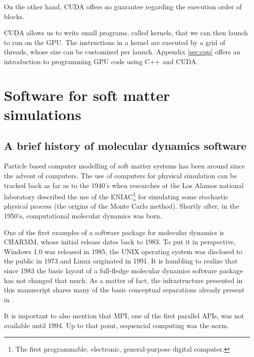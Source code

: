 \documentclass[ twoside,openright,titlepage,numbers=noenddot,%
headinclude,footinclude,cleardoublepage=empty,abstract=on,
BCOR=5mm,paper=a4,fontsize=11pt, dvipsnames
]{scrreprt}
\newcommand{\gpu}{\gls{GPU}\xspace}
\begin{document}
On the other hand, CUDA offers no guarantee regarding the execution order of blocks.

CUDA allows us to write small programs, called kernels, that we can then launch to run on the \gpu. The instructions in a kernel are executed by a grid of threads, whose size can be customized per launch. Appendix \ref{sec:cpp} offers an introduction to programming \gpu code using C++ and CUDA.


\section{Software for soft matter simulations}

\subsection*{A brief history of molecular dynamics software}
Particle based computer modelling of soft matter systems has been around since the advent of computers. The use of computers for physical simulation can be tracked back as far as to the 1940's when researches at the Los Alamos national laboratory described the use of the ENIAC\footnote{The first programmable, electronic, general-purpose digital computer.} for simulating some stochastic physical process\cite{Hurd1985} (the origins of the Monte Carlo method\cite{Johansen2010}). Shortly after, in the 1950's, computational molecular dynamics was born\cite{DeTullio2016}.

One of the first examples of a software package for molecular dynamics is CHARMM, whose initial release dates back to 1983\cite{Brooks1983}. To put it in perspective, Windows 1.0 was released in 1985, the UNIX operating system was disclosed to the public in 1973 and Linux originated in 1991. It is humbling to realize that since 1983 the basic layout of a full-fledge molecular dynamics software package has not changed that much. As a matter of fact, the infrastructure presented in this manuscript shares many of the basic conceptual separations already present in \cite{Brooks1983}.

It is important to also mention that MPI, one of the first parallel \glspl{API}, was not available until 1994. Up to that point, sequencial computing was the norm.
\end{document}
